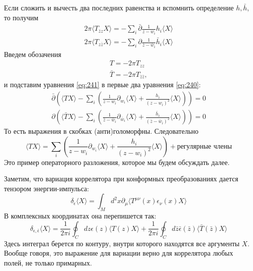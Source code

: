 \documentclass[a4paper,12pt]{article}
\theoremstyle{definition}
\theoremstyle{definition}
\theoremstyle{definition}
\begin{document}
Если сложить и вычесть два последних равенства и вспомнить определение $h, \bar h$, то получим
\begin{eqnarray}
  \label{eq:241}
  2\pi \langle T_{\bar z z} X\rangle = -\sum_{i} \bar \partial \frac{1}{z-w_{i}} h_{i} \langle X\rangle\\
  2\pi \langle T_{z \bar z} X\rangle = -\sum_{i}  \partial \frac{1}{\bar z-\bar w_{i}} \bar h_{i} \langle X\rangle
\end{eqnarray}
Введем обозачения
\begin{eqnarray}
  \label{eq:242}
  T=-2\pi T_{zz}\\
  \bar T = -2 \pi T_{\bar z \bar z},
\end{eqnarray}
и подставим уравнения \eqref{eq:241} в первые два уравнения \eqref{eq:240}:
\begin{eqnarray}
  \label{eq:243}
  \bar \partial \left( \langle T X\rangle -\sum_{i} \left( \frac{1}{z-w_{i}} \partial_{w_{i}} \langle X\rangle + \frac{h_{i}}{(z-w_{i})^{2}} \langle X\rangle \right) \right) =0\\
  \partial \left( \langle \bar T X\rangle -\sum_{i} \left( \frac{1}{\bar z-\bar w_{i}} \partial_{\bar w_{i}} \langle X\rangle + \frac{\bar h_{i}}{(\bar z-\bar w_{i})^{2}} \langle X\rangle \right) \right) =0
\end{eqnarray}
То есть выражения в скобках (анти)голоморфны. Следовательно
\begin{equation}
  \label{eq:244}
  \langle T X\rangle =\sum_{i} \left( \frac{1}{z-w_{i}} \partial_{w_{i}} \langle X\rangle + \frac{h_{i}}{(z-w_{i})^{2}} \langle X\rangle \right) +\mbox{регулярные члены}
\end{equation}
Это пример операторного разложения, которое мы будем обсуждать далее. 

Заметим, что вариация коррелятора при конформных преобразованиях дается тензором энергии-импульса:
\begin{equation}
  \label{eq:245}
  \delta_{\epsilon}\langle X\rangle =\int_{M} d^{2}x \partial_{\mu} \langle T^{\mu\nu}(x)\epsilon_{\nu}(x) X \rangle
\end{equation}
В комплексных координатах она перепишется так:
\begin{equation}
  \label{eq:246}
  \delta_{\epsilon,\bar \epsilon} \langle X\rangle = \frac{1}{2\pi i} \oint_{C} dz \epsilon(z) \langle T(z) X\rangle +\frac{1}{2\pi i} \oint_{C}  d\bar z \bar \epsilon(\bar z) \langle \bar T(\bar z) X\rangle
\end{equation}
Здесь интеграл берется по контуру, внутри которого находятся все аргументы $X$.
Вообще говоря, это выражение для вариации верно для коррелятора любых полей, не только примарных.
\end{document}
